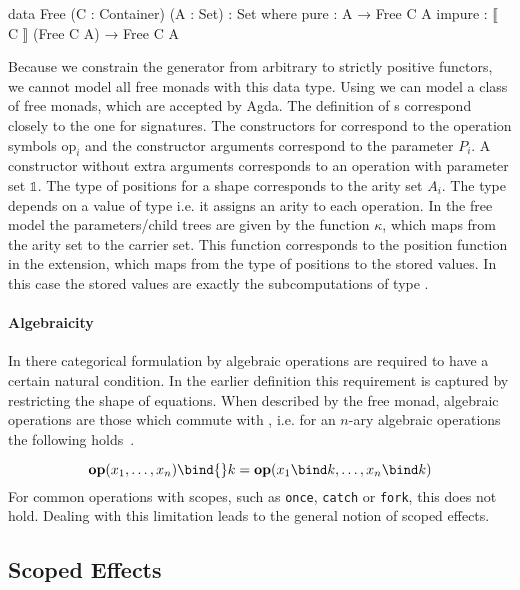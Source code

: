 \begin{code}
data Free (C : Container) (A : Set) : Set where
  pure    : A → Free C A
  impure  : ⟦ C ⟧ (Free C A) → Free C A
\end{code}
Because we constrain the generator from arbitrary to strictly positive functors,
we cannot model all free monads with this data type.
Using  we can model a class of free monads, which are
accepted by Agda.
The definition of s correspond closely to the one for
signatures.
The constructors for  correspond to the operation symbols
$\mathrm{op}_i$ and the constructor arguments correspond to the parameter $P_i$.
A constructor without extra arguments corresponds to an operation with
parameter set $\mathbb{1}$.
The type of positions for a shape corresponds to the arity set $A_i$.
The  type depends on a value of type  i.e. it
assigns an arity to each operation.
In the free model the parameters/child trees are given by the function $\kappa$,
which maps from the arity set to the carrier set.
This function corresponds to the position function in the
 extension, which maps from the type of positions to the
stored values.
In this case the stored values are exactly the subcomputations of type
\AgdaSpace{}\AgdaSpace{}.

\paragraph{Algebraicity}
In there categorical formulation by \textcite{DBLP:conf/fossacs/PlotkinP02}
algebraic operations are required to have a certain natural condition.
In the earlier definition this requirement is captured by restricting the shape
of equations.
When described by the free monad, algebraic operations are those which commute
with \bind{}, i.e. for an $n$-ary algebraic operations the following
holds~\cite{DBLP:conf/lics/PirogSWJ18}.

\[
  \mathbf{op}(x_1,\dots ,x_n) \bind{} k = \mathbf{op}(x_1\bind k,\dots
  ,x_n\bind k)
\]
For common operations with scopes, such as \texttt{once}, \texttt{catch} or
\texttt{fork}, this does not hold.
Dealing with this limitation leads to the general notion of scoped effects.


\subsection{Scoped Effects}
\label{preliminaries:scoped-effects}

